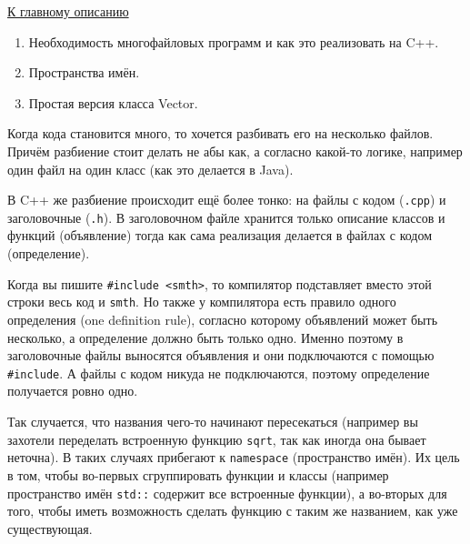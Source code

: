 \label{md2tex2}
\hyperref[md2texREADME]{К главному описанию}


\begin{enumerate}
    \item Необходимость многофайловых программ и как это реализовать на C++.
    \item Пространства имён.
    \item Простая версия класса Vector.
\end{enumerate}


Когда кода становится много, то хочется разбивать его на несколько файлов. Причём разбиение стоит делать не абы как, а согласно какой-то логике, например один файл на один класс (как это делается в Java).

В C++ же разбиение происходит ещё более тонко: на файлы с кодом (\texttt{.cpp}) и заголовочные (\texttt{.h}). В заголовочном файле хранится только описание классов и функций (объявление) тогда как сама реализация делается в файлах с кодом (определение).

Когда вы пишите \texttt{#include <smth>}, то компилятор подставляет вместо этой строки весь код и \texttt{smth}. Но также у компилятора есть правило одного определения (one definition rule), согласно которому объявлений может быть несколько, а определение должно быть только одно. Именно поэтому в заголовочные файлы выносятся объявления и они подключаются с помощью \texttt{#include}. А файлы с кодом никуда не подключаются, поэтому определение получается ровно одно.


Так случается, что названия чего-то начинают пересекаться (например вы захотели переделать встроенную функцию \texttt{sqrt}, так как иногда она бывает неточна). В таких случаях прибегают к \texttt{namespace} (пространство имён). Их цель в том, чтобы во-первых сгруппировать функции и классы (например пространство имён \texttt{std::} содержит все встроенные функции), а во-вторых для того, чтобы иметь возможность сделать функцию с таким же названием, как уже существующая.


